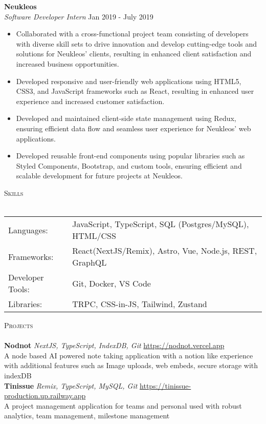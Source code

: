 \documentclass[a4paper]{article}
\newcommand{\lineunder} {
    \vspace*{-8pt} \\
    \hspace*{-18pt} \hrulefill \\
}
\newcommand{\header} [1] {
    {\hspace*{-18pt}\vspace*{6pt} \textsc{#1}}
    \vspace*{-6pt} \lineunder
}
\begin{document}
      \textbf{Neukleos}\\
          \textit{Software Developer Intern} \hfill Jan 2019 - July 2019\\
          \vspace{-1mm}
\begin{itemize} \itemsep 1pt
      \item Collaborated with a cross-functional project team consisting of developers with diverse skill sets to drive innovation and develop cutting-edge tools and solutions for Neukleos' clients, resulting in enhanced client satisfaction and increased business opportunities.
      \item Developed responsive and user-friendly web applications using HTML5, CSS3, and JavaScript frameworks such as React, resulting in enhanced user experience and increased customer satisfaction.
      \item Developed and maintained client-side state management using Redux, ensuring efficient data flow and seamless user experience for Neukleos' web applications.
      \item Developed reusable front-end components using popular libraries such as Styled Components, Bootstrap, and custom tools, ensuring efficient and scalable development for future projects at Neukleos.
\end{itemize}

\header{Skills}
\begin{tabular}{V{5cm} @{\hskip 0.6cm} V{12cm}}
Languages: & JavaScript, TypeScript, SQL (Postgres/MySQL), HTML/CSS \\
Frameworks: & React(NextJS/Remix), Astro, Vue, Node.js, REST, GraphQL \\
Developer Tools: & Git, Docker, VS Code \\
Libraries: & TRPC, CSS-in-JS, Tailwind, Zustand \\
\end{tabular}
\vspace{2mm}

\header{Projects}
      {\textbf{Nodnot}} {\sl NextJS, TypeScript, IndexDB, Git} \hfill \url{https://nodnot.vercel.app}\\
A node based AI powered note taking application with a notion like experience with additional features such as Image uploads, web embeds, secure storage with indexDB\\
\vspace*{2mm}
      {\textbf{Tinissue}} {\sl Remix, TypeScript, MySQL, Git} \hfill \url{https://tinissue-production.up.railway.app}\\
A project management application for teams and personal used with robust analytics, team management, milestone management\\
\vspace*{2mm}

    
\end{document}
